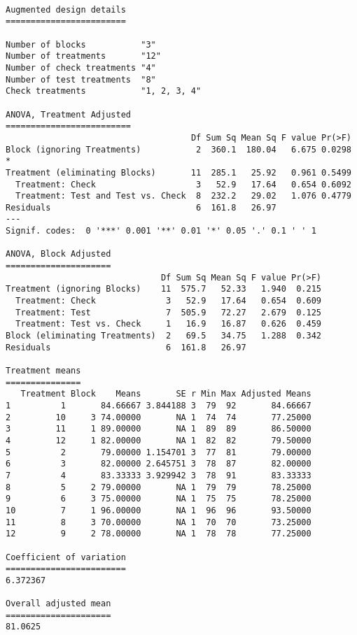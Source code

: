 \documentclass[]{article}
\begin{document}
\begin{verbatim}

Augmented design details
========================
                                       
Number of blocks           "3"         
Number of treatments       "12"        
Number of check treatments "4"         
Number of test treatments  "8"         
Check treatments           "1, 2, 3, 4"

ANOVA, Treatment Adjusted
=========================
                                     Df Sum Sq Mean Sq F value Pr(>F)  
Block (ignoring Treatments)           2  360.1  180.04   6.675 0.0298 *
Treatment (eliminating Blocks)       11  285.1   25.92   0.961 0.5499  
  Treatment: Check                    3   52.9   17.64   0.654 0.6092  
  Treatment: Test and Test vs. Check  8  232.2   29.02   1.076 0.4779  
Residuals                             6  161.8   26.97                 
---
Signif. codes:  0 '***' 0.001 '**' 0.01 '*' 0.05 '.' 0.1 ' ' 1

ANOVA, Block Adjusted
=====================
                               Df Sum Sq Mean Sq F value Pr(>F)
Treatment (ignoring Blocks)    11  575.7   52.33   1.940  0.215
  Treatment: Check              3   52.9   17.64   0.654  0.609
  Treatment: Test               7  505.9   72.27   2.679  0.125
  Treatment: Test vs. Check     1   16.9   16.87   0.626  0.459
Block (eliminating Treatments)  2   69.5   34.75   1.288  0.342
Residuals                       6  161.8   26.97               

Treatment means
===============
   Treatment Block    Means       SE r Min Max Adjusted Means
1          1       84.66667 3.844188 3  79  92       84.66667
2         10     3 74.00000       NA 1  74  74       77.25000
3         11     1 89.00000       NA 1  89  89       86.50000
4         12     1 82.00000       NA 1  82  82       79.50000
5          2       79.00000 1.154701 3  77  81       79.00000
6          3       82.00000 2.645751 3  78  87       82.00000
7          4       83.33333 3.929942 3  78  91       83.33333
8          5     2 79.00000       NA 1  79  79       78.25000
9          6     3 75.00000       NA 1  75  75       78.25000
10         7     1 96.00000       NA 1  96  96       93.50000
11         8     3 70.00000       NA 1  70  70       73.25000
12         9     2 78.00000       NA 1  78  78       77.25000

Coefficient of variation
========================
6.372367

Overall adjusted mean
=====================
81.0625


\end{verbatim}
\end{document}
